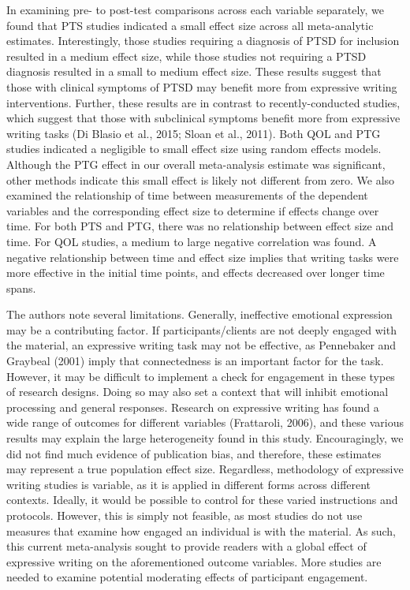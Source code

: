 \documentclass[man, mask]{apa6}
\newcounter{author}
\theoremstyle{definition}
\theoremstyle{definition}
\theoremstyle{definition}
\theoremstyle{remark}
\begin{document}
In examining pre- to post-test comparisons across each variable
separately, we found that PTS studies indicated a small effect size
across all meta-analytic estimates. Interestingly, those studies
requiring a diagnosis of PTSD for inclusion resulted in a medium effect
size, while those studies not requiring a PTSD diagnosis resulted in a
small to medium effect size. These results suggest that those with
clinical symptoms of PTSD may benefit more from expressive writing
interventions. Further, these results are in contrast to
recently-conducted studies, which suggest that those with subclinical
symptoms benefit more from expressive writing tasks (Di Blasio et al.,
2015; Sloan et al., 2011). Both QOL and PTG studies indicated a
negligible to small effect size using random effects models. Although
the PTG effect in our overall meta-analysis estimate was significant,
other methods indicate this small effect is likely not different from
zero. We also examined the relationship of time between measurements of
the dependent variables and the corresponding effect size to determine
if effects change over time. For both PTS and PTG, there was no
relationship between effect size and time. For QOL studies, a medium to
large negative correlation was found. A negative relationship between
time and effect size implies that writing tasks were more effective in
the initial time points, and effects decreased over longer time spans.

The authors note several limitations. Generally, ineffective emotional
expression may be a contributing factor. If participants/clients are not
deeply engaged with the material, an expressive writing task may not be
effective, as Pennebaker and Graybeal (2001) imply that connectedness is
an important factor for the task. However, it may be difficult to
implement a check for engagement in these types of research designs.
Doing so may also set a context that will inhibit emotional processing
and general responses. Research on expressive writing has found a wide
range of outcomes for different variables (Frattaroli, 2006), and these
various results may explain the large heterogeneity found in this study.
Encouragingly, we did not find much evidence of publication bias, and
therefore, these estimates may represent a true population effect size.
Regardless, methodology of expressive writing studies is variable, as it
is applied in different forms across different contexts. Ideally, it
would be possible to control for these varied instructions and
protocols. However, this is simply not feasible, as most studies do not
use measures that examine how engaged an individual is with the
material. As such, this current meta-analysis sought to provide readers
with a global effect of expressive writing on the aforementioned outcome
variables. More studies are needed to examine potential moderating
effects of participant engagement.
\end{document}
